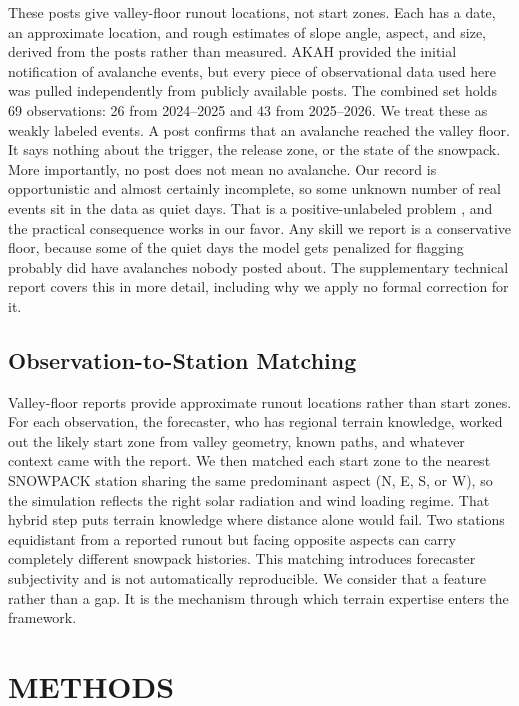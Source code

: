 \documentclass{issw}
\begin{document}
These posts give valley-floor runout locations, not start zones. Each has a date, an approximate location, and rough estimates of slope angle, aspect, and size, derived from the posts rather than measured. AKAH provided the initial notification of avalanche events, but every piece of observational data used here was pulled independently from publicly available posts. The combined set holds 69 observations: 26 from 2024–2025 and 43 from 2025–2026.
We treat these as weakly labeled events. A post confirms that an avalanche reached the valley floor. It says nothing about the trigger, the release zone, or the state of the snowpack. More importantly, no post does not mean no avalanche. Our record is opportunistic and almost certainly incomplete, so some unknown number of real events sit in the data as quiet days.
That is a positive-unlabeled problem \parencite{ElkanNoto2008}, and the practical consequence works in our favor. Any skill we report is a conservative floor, because some of the quiet days the model gets penalized for flagging probably did have avalanches nobody posted about. The supplementary technical report \parencite{ShelegEtAl2026} covers this in more detail, including why we apply no formal correction for it.

\subsection{Observation-to-Station Matching}
\label{sec:obs-matching}
Valley-floor reports provide approximate runout locations rather than start zones. For each observation, the forecaster, who has regional terrain knowledge, worked out the likely start zone from valley geometry, known paths, and whatever context came with the report. We then matched each start zone to the nearest SNOWPACK station sharing the same predominant aspect (N, E, S, or W), so the simulation reflects the right solar radiation and wind loading regime.
That hybrid step puts terrain knowledge where distance alone would fail. Two stations equidistant from a reported runout but facing opposite aspects can carry completely different snowpack histories. This matching introduces forecaster subjectivity and is not automatically reproducible. We consider that a feature rather than a gap. It is the mechanism through which terrain expertise enters the framework.

\section{METHODS}
\end{document}
